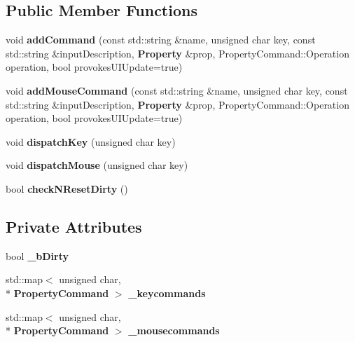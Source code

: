 \subsection*{Public Member Functions}
\begin{DoxyCompactItemize}
\item 
void {\bfseries add\-Command} (const std\-::string \&name, unsigned char key, const std\-::string \&input\-Description, {\bf Property} \&prop, Property\-Command\-::\-Operation operation, bool provokes\-U\-I\-Update=true)\label{classsfs__visualizer_1_1CommandManager_a095b9ca729812dc23abd0f3bf9036dc4}

\item 
void {\bfseries add\-Mouse\-Command} (const std\-::string \&name, unsigned char key, const std\-::string \&input\-Description, {\bf Property} \&prop, Property\-Command\-::\-Operation operation, bool provokes\-U\-I\-Update=true)\label{classsfs__visualizer_1_1CommandManager_ab68861e23d76b02f3bc18695ef7374dd}

\item 
void {\bfseries dispatch\-Key} (unsigned char key)\label{classsfs__visualizer_1_1CommandManager_a0df8c9aca76da88b8ea6878b3bdea3ff}

\item 
void {\bfseries dispatch\-Mouse} (unsigned char key)\label{classsfs__visualizer_1_1CommandManager_a01593421c259a5711a54a2cbde85d494}

\item 
bool {\bfseries check\-N\-Reset\-Dirty} ()\label{classsfs__visualizer_1_1CommandManager_a78df62b34b26990ac74eaf8f565465d4}

\end{DoxyCompactItemize}
\subsection*{Private Attributes}
\begin{DoxyCompactItemize}
\item 
bool {\bfseries \-\_\-b\-Dirty}\label{classsfs__visualizer_1_1CommandManager_afe91bb38d7a8e4d4648c5cd6b163a8f5}

\item 
std\-::map$<$ unsigned char, \\*
{\bf Property\-Command} $>$ {\bfseries \-\_\-keycommands}\label{classsfs__visualizer_1_1CommandManager_a5b254603d1ced0330d437bab4ebed23a}

\item 
std\-::map$<$ unsigned char, \\*
{\bf Property\-Command} $>$ {\bfseries \-\_\-mousecommands}\label{classsfs__visualizer_1_1CommandManager_a9ec682196453e50cd7c0e32d777951ae}

\end{DoxyCompactItemize}



